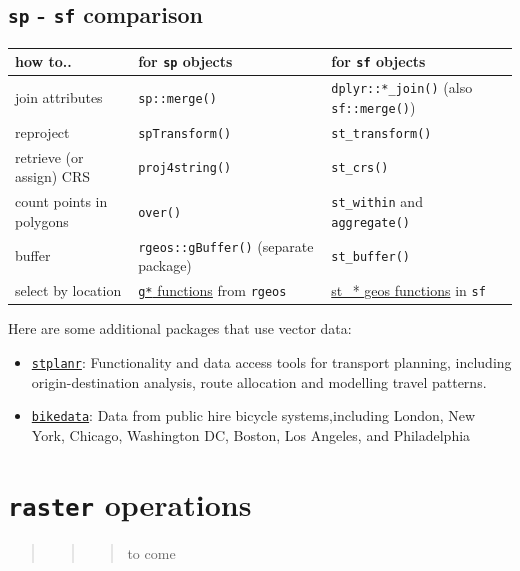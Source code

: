 \documentclass[]{book}
\providecommand{\tightlist}{%
  \setlength{\itemsep}{0pt}\setlength{\parskip}{0pt}}
\begin{document}
\subsection{\texorpdfstring{\texttt{sp} - \texttt{sf}
comparison}{sp - sf comparison}}\label{sp---sf-comparison}

\begin{longtable}[]{@{}lll@{}}
\toprule
how to.. & for \texttt{sp} objects & for \texttt{sf}
objects\tabularnewline
\midrule
\endhead
join attributes & \texttt{sp::merge()} & \texttt{dplyr::*\_join()} (also
\texttt{sf::merge()})\tabularnewline
reproject & \texttt{spTransform()} &
\texttt{st\_transform()}\tabularnewline
retrieve (or assign) CRS & \texttt{proj4string()} &
\texttt{st\_crs()}\tabularnewline
count points in polygons & \texttt{over()} & \texttt{st\_within} and
\texttt{aggregate()}\tabularnewline
buffer & \texttt{rgeos::gBuffer()} (separate package) &
\texttt{st\_buffer()}\tabularnewline
select by location &
\href{https://www.rdocumentation.org/packages/rgeos/}{\texttt{g*}
functions} from \texttt{rgeos} &
\href{https://www.rdocumentation.org/packages/sf/topics/geos}{st\_* geos
functions} in \texttt{sf}\tabularnewline
\bottomrule
\end{longtable}

Here are some additional packages that use vector data:

\begin{itemize}
\tightlist
\item
  \href{https://CRAN.R-project.org/package=stplanr}{\texttt{stplanr}}:
  Functionality and data access tools for transport planning, including
  origin-destination analysis, route allocation and modelling travel
  patterns.
\item
  \href{https://CRAN.R-project.org/package=bikedata}{\texttt{bikedata}}:
  Data from public hire bicycle systems,including London, New York,
  Chicago, Washington DC, Boston, Los Angeles, and Philadelphia
\end{itemize}

\section{\texorpdfstring{\texttt{raster}
operations}{raster operations}}\label{raster-operations}

\begin{quote}
\begin{quote}
\begin{quote}
to come
\end{quote}
\end{quote}
\end{quote}
\end{document}
